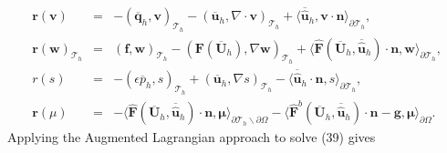 \documentclass[11pt]{article}
\begin{document}
\begin{equation}
\begin{array}{rcl}
 \bm{r}(\bm{v}) & = & -(\overline{\bm{q}}_h, \bm{v})_{\mathcal{T}_h} - (\overline{\bm{u}}_h, \nabla \cdot \bm{v})_{\mathcal{T}_h} + \langle \overline{\widehat{\bm{u}}}_h, \bm{v} \cdot \bm{n} \rangle_{\partial \mathcal{T}_h},  \\[2ex]
\bm{r}(\bm{w})_{\mathcal{T}_h} & = & (\bm{f}, \bm{w})_{\mathcal{T}_h} - (\bm{F} (\overline{\bm{U}}_h), \nabla \bm{w})_{\mathcal{T}_h} + \langle \widehat{\bm{F}} (\overline{\bm{U}}_h, \overline{\widehat{\bm{u}}}_h) \cdot \bm{n}, \bm{w} \rangle_{\partial \mathcal{T}_h} , \\[2ex]
r(s) & = & -(\epsilon \overline{p}_h, s)_{\mathcal{T}_h} + (\overline{\bm{u}}_h, \nabla s)_{\mathcal{T}_h} - \langle \overline{\widehat{\bm{u}}}_h \cdot \bm{n},s \rangle_{\partial \mathcal{T}_h} ,\\[2ex]
\bm{r}(\mu) & = & - \langle \widehat{\bm{F}} (\overline{\bm{U}}_h, \overline{\widehat{\bm{u}}}_h) \cdot \bm{n}, \bm{\mu} \rangle_{\partial \mathcal{T}_h \backslash \partial \Omega} - \langle \widehat{\bm{F}}^b(\overline{\bm{U}}_h,\overline{\widehat{\bm{u}}}_h) \cdot \bm{n} - \bm{g}, \bm{\mu} \rangle_{\partial \Omega} .
\end{array}
\end{equation}
Applying the Augmented Lagrangian approach to solve (39) gives
\end{document}

